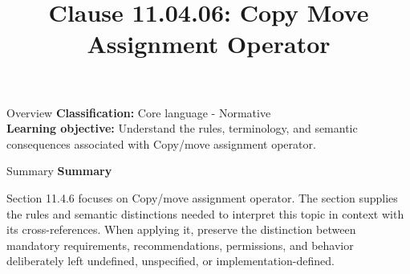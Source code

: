 \documentclass[10pt,letterpaper]{article}
\title{Clause 11.04.06: Copy Move Assignment Operator}
\author{}
\date{}
\begin{document}
\maketitle
\begin{CornellOverviewBox}{Overview}
\textbf{Classification:} Core language - Normative\\[2pt]
\textbf{Learning objective:} Understand the rules, terminology, and semantic consequences associated with Copy/move assignment operator.
\end{CornellOverviewBox}\begin{CornellSummaryBox}{Summary}
{\sffamily\bfseries\color{Accent} Summary}\par\vspace{3pt}Section 11.4.6 focuses on Copy/move assignment operator. The section supplies the rules and semantic distinctions needed to interpret this topic in context with its cross-references. When applying it, preserve the distinction between mandatory requirements, recommendations, permissions, and behavior deliberately left undefined, unspecified, or implementation-defined.
\end{CornellSummaryBox}
\end{document}
